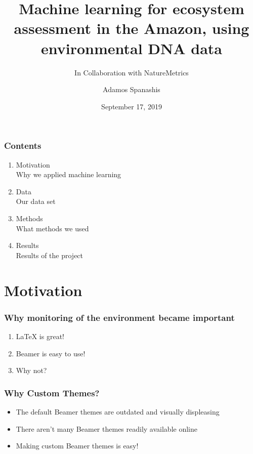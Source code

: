\documentclass[xcolor={table}]{beamer}
\title{Machine learning for ecosystem
assessment in the Amazon, using
environmental DNA data}
\subtitle{In Collaboration with NatureMetrics}
\author{Adamos Spanashis}
\date{September 17, 2019}
\begin{document}
	\setcounter{showProgressBar}{0}
	\setcounter{showSlideNumbers}{0}

	\frame{\titlepage}

	\begin{frame}
		\frametitle{Contents}
		\begin{enumerate}
			\item Motivation \\ \textcolor{ExecusharesGrey}{\footnotesize\hspace{1em} Why we applied machine learning}
			\item Data \\ \textcolor{ExecusharesGrey}{\footnotesize\hspace{1em} Our data set}
			\item Methods  \\ \textcolor{ExecusharesGrey}{\footnotesize\hspace{1em} What methods we used}
			\item Results \\ \textcolor{ExecusharesGrey}{\footnotesize\hspace{1em} Results of the project}
		\end{enumerate}
	\end{frame}

	\setcounter{framenumber}{0}
	\setcounter{showProgressBar}{1}
	\setcounter{showSlideNumbers}{1}
	\section{Motivation}
		\begin{frame}
			\frametitle{Why monitoring of the environment became important}
			\begin{enumerate}
				\item LaTeX is great!
				\item Beamer is easy to use!
				\item Why not?
			\end{enumerate}
		\end{frame}

		\begin{frame}
			\frametitle{Why Custom Themes?}
			\begin{itemize}
				\item The default Beamer themes are outdated and visually displeasing
				\item There aren't many Beamer themes readily available online
				\item Making custom Beamer themes is easy!
			\end{itemize}
		\end{frame}
\end{document}
